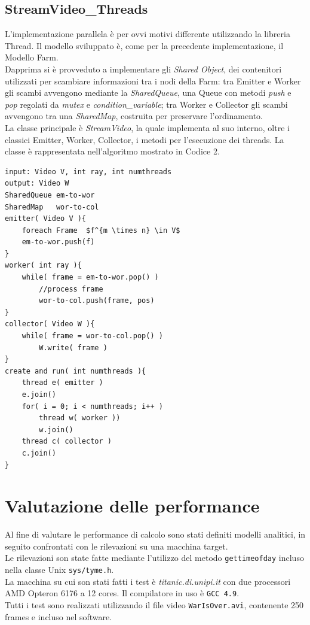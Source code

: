 \documentclass[12pt]{article}
\begin{document}
\subsection{StreamVideo\_Threads}
L'implementazione parallela \`e per ovvi motivi differente utilizzando la libreria Thread. Il modello sviluppato \`e, come per la precedente implementazione, il Modello Farm. 
\\Dapprima si \`e provveduto a implementare gli \textit{Shared Object}, dei contenitori utilizzati per scambiare informazioni tra i nodi della Farm: tra Emitter e Worker gli scambi avvengono mediante la \textit{SharedQueue}, una Queue con metodi \textit{push} e \textit{pop} regolati da \textit{mutex} e \textit{condition\_variable}; tra Worker e Collector gli scambi avvengono tra una \textit{SharedMap}, costruita per preservare l'ordinamento. 
\\La classe principale \`e \textit{StreamVideo}, la quale implementa al suo interno, oltre i classici Emitter, Worker, Collector, i metodi per l'esecuzione dei threads. La classe \`e rappresentata nell'algoritmo mostrato in Codice 2. 

\begin{lstlisting}[backgroundcolor=\color{White}, caption={Pseudo-code StreamVideo\_Threads}, mathescape=true] 
input: Video V, int ray, int numthreads
output: Video W
SharedQueue em-to-wor
SharedMap   wor-to-col
emitter( Video V ){
	foreach Frame  $f^{m \times n} \in V$
	em-to-wor.push(f)
}
worker( int ray ){
	while( frame = em-to-wor.pop() )
		//process frame
		wor-to-col.push(frame, pos)
}
collector( Video W ){
	while( frame = wor-to-col.pop() )
		W.write( frame )
}
create and run( int numthreads ){
	thread e( emitter )
	e.join()
	for( i = 0; i < numthreads; i++ )
		thread w( worker ))
		w.join()
	thread c( collector )
	c.join() 
}
\end{lstlisting}


\section{Valutazione delle performance}
Al fine di valutare le performance di calcolo sono stati definiti modelli analitici, in seguito confrontati con le rilevazioni su una macchina target. 
\\Le rilevazioni son state fatte mediante l'utilizzo del metodo \texttt{gettimeofday} incluso nella classe Unix \texttt{sys/tyme.h}. 
\\La macchina su cui son stati fatti i test \`e \textit{titanic.di.unipi.it} con due processori AMD Opteron 6176 a 12 cores. Il compilatore in uso \`e \texttt{GCC 4.9}.
\\Tutti i test sono realizzati utilizzando il file video \texttt{WarIsOver.avi}, contenente 250 frames e incluso nel software.
\end{document}
